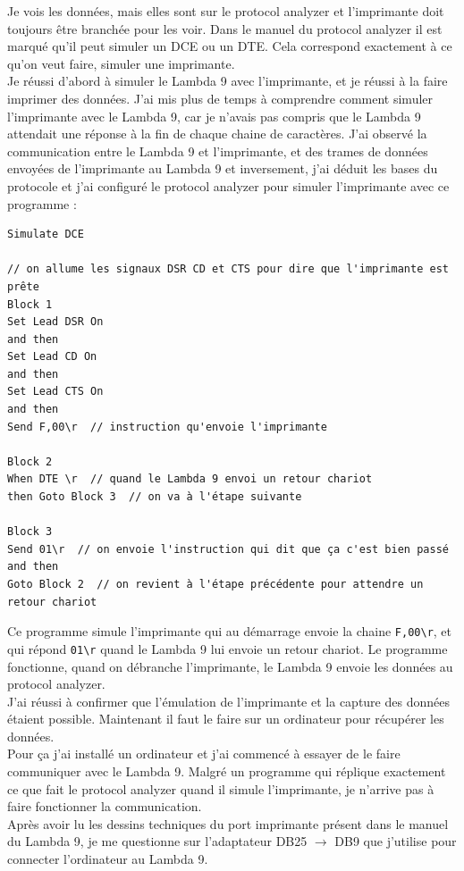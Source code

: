 \documentclass[12pt]{article}
\begin{document}
Je vois les données, mais elles sont sur le protocol analyzer et l'imprimante doit toujours être branchée pour les voir.
Dans le manuel du protocol analyzer il est marqué qu'il peut simuler un DCE ou un DTE.
Cela correspond exactement à ce qu'on veut faire, simuler une imprimante.\\
Je réussi d'abord à simuler le Lambda 9 avec l'imprimante, et je réussi à la faire imprimer des données.
J'ai mis plus de temps à comprendre comment simuler l'imprimante avec le Lambda 9, car je n'avais pas compris que le Lambda 9 attendait une réponse à la fin de chaque chaine de caractères.
J'ai observé la communication entre le Lambda 9 et l'imprimante, et des trames de données envoyées de l'imprimante au Lambda 9 et inversement, j'ai déduit les bases du protocole et j'ai configuré le protocol analyzer pour simuler l'imprimante avec ce programme :
\FloatBarrier
\begin{lstlisting}
Simulate DCE

// on allume les signaux DSR CD et CTS pour dire que l'imprimante est prête
Block 1
Set Lead DSR On
and then
Set Lead CD On
and then
Set Lead CTS On
and then
Send F,00\r  // instruction qu'envoie l'imprimante

Block 2
When DTE \r  // quand le Lambda 9 envoi un retour chariot
then Goto Block 3  // on va à l'étape suivante

Block 3
Send 01\r  // on envoie l'instruction qui dit que ça c'est bien passé
and then
Goto Block 2  // on revient à l'étape précédente pour attendre un retour chariot
\end{lstlisting}
Ce programme simule l'imprimante qui au démarrage envoie la chaine \verb|F,00\r|, et qui répond \verb|01\r| quand le Lambda 9 lui envoie un retour chariot.
Le programme fonctionne, quand on débranche l'imprimante, le Lambda 9 envoie les données au protocol analyzer.\\
J'ai réussi à confirmer que l'émulation de l'imprimante et la capture des données étaient possible.
Maintenant il faut le faire sur un ordinateur pour récupérer les données.\\
Pour ça j'ai installé un ordinateur et j'ai commencé à essayer de le faire communiquer avec le Lambda 9.
Malgré un programme qui réplique exactement ce que fait le protocol analyzer quand il simule l'imprimante, je n'arrive pas à faire fonctionner la communication.\\
Après avoir lu les dessins techniques du port imprimante présent dans le manuel du Lambda 9, je me questionne sur l'adaptateur DB25 $\rightarrow$ DB9 que j'utilise pour connecter l'ordinateur au Lambda 9.\\
\end{document}

